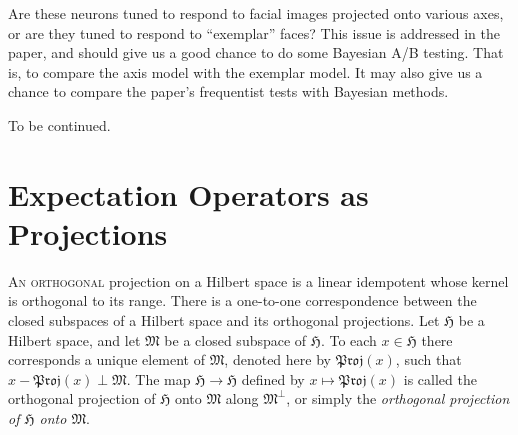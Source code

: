\documentclass[
twoside=true,
paper=letter,
fontsize=11pt,
pagesize=auto,
leqno,
openany,
headsepline,
overfullrule,
]{scrbook}
\theoremstyle{plain}
\theoremstyle{plain}
\theoremstyle{definition}
\theoremstyle{bfnoteitalic}
\theoremstyle{bfnoteroman}
\begin{document}
Are these neurons tuned to respond to facial images projected onto various axes, or are they tuned to respond to ``exemplar'' faces? This issue is addressed in the paper, and should give us a good chance to do some Bayesian A/B testing.  That is, to compare the axis model with the exemplar model. It may also give us a chance to compare the paper's frequentist tests with Bayesian methods.

To be continued.





\chapter{Expectation Operators as Projections}
%
\newcommand{\proj}{\mathfrak{Proj}}
\newcommand{\projsub}[1]{\mathop{\proj\kern-1pt}\nolimits_#1}
\newcommand{\projgvn}[2]
{\mathop{\proj}\nolimits(#2,#1)}
\newcommand{\raum}[1]{\mathfrak{#1}}
\newcommand{\inner}[2]{\left\langle#1,#2\right\rangle}
\newcommand{\hilbertspace}{\mathfrak{H}}
\newcommand{\hilbertsubspace}{\mathfrak{M}}
\newcommand{\hilbertelt}{x}
\newcommand{\hilberteltii}{y}
\newcommand{\hilbertortho}{e_1}
\newcommand{\hilbertorthoii}{e_2}
\newcommand{\hilbertorthoi}{e_i}
\newcommand{\hilbertorthon}{e_n}

\lettrine{A}{n orthogonal} projection on a Hilbert space is a linear idempotent whose kernel is orthogonal to its range.
There is a one-to-one correspondence between the closed subspaces of a Hilbert space and its orthogonal projections.
Let $\hilbertspace$ be a Hilbert space, and let $\hilbertsubspace$ be a closed subspace of $\hilbertspace$. To each $\hilbertelt\in\hilbertspace$ there corresponds a unique element of $\hilbertsubspace$, denoted here by
$\proj(\hilbertelt)$,  such that 
$\hilbertelt-\proj(\hilbertelt) \perp \hilbertsubspace$.
The map $\hilbertspace \to \hilbertspace$ defined by 
$\hilbertelt\mapsto \proj(\hilbertelt)$ is called the orthogonal projection of 
$\hilbertspace$ onto $\hilbertsubspace$ along ${\hilbertsubspace}^\perp$, or simply the
\emph{orthogonal projection of $\boldsymbol{\hilbertspace}$ 
onto $\boldsymbol{\hilbertsubspace}$}.
\end{document}
